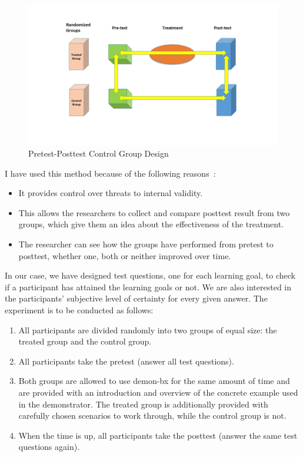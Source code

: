 \begin{figure}
	\includegraphics[width=1\textwidth]{figures/PrePost_Test}
	\caption{Pretest-Posttest Control Group Design }
	\label{fig:PrePost_Test}
\end{figure}

I have used this method because of the following reasons~\cite{anovapreposttest}:
\begin{itemize}
	\item It provides control over threats to internal validity.
	\item This allows the researchers to collect and compare posttest result from two groups, which give them an idea about the effectiveness of the treatment.
	\item The researcher can see how the groups have performed from pretest to posttest, whether one, both or neither improved over time.
\end{itemize}

In our case, we have designed test questions, one for each learning goal, to check if a participant has attained the learning goals or not.
We are also interested in the participants' subjective level of certainty for every given answer. 
The experiment is to be conducted as follows:

\begin{enumerate}
	\item All participants are divided randomly into two groups of equal size: the treated group and the control group.
	\item All participants take the pretest (answer all test questions).
	\item Both groups are allowed to use demon-bx for the same amount of time and are provided with an introduction and overview of the concrete example used in the demonstrator.
	The treated group is additionally provided with carefully chosen scenarios to work through, while the control group is not.
	\item When the time is up, all participants take the posttest (answer the same test questions again).
\end{enumerate}


